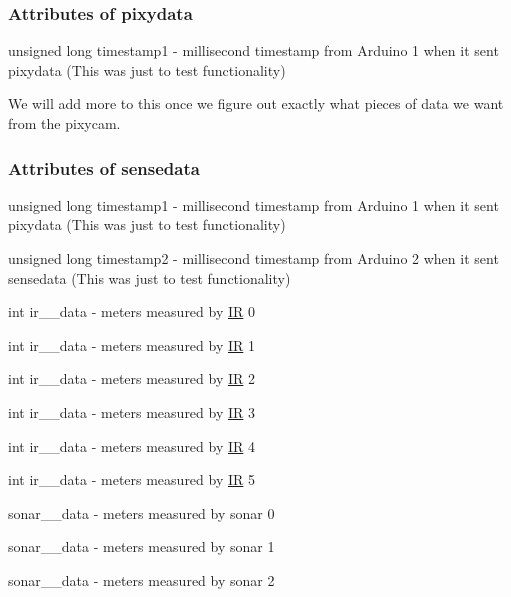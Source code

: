 \subsubsection*{Attributes of pixydata}


\begin{DoxyItemize}
\item {\ttfamily unsigned long timestamp1} -\/ millisecond timestamp from Arduino 1 when it sent {\ttfamily pixydata} (This was just to test functionality)
\end{DoxyItemize}

We will add more to this once we figure out exactly what pieces of data we want from the pixycam.

\subsubsection*{Attributes of sensedata}


\begin{DoxyItemize}
\item {\ttfamily unsigned long timestamp1} -\/ millisecond timestamp from Arduino 1 when it sent {\ttfamily pixydata} (This was just to test functionality)
\item {\ttfamily unsigned long timestamp2} -\/ millisecond timestamp from Arduino 2 when it sent {\ttfamily sensedata} (This was just to test functionality)
\item {\ttfamily int ir\+\_\+\_\+data} -\/ meters measured by \hyperlink{class_i_r}{IR} 0
\item {\ttfamily int ir\+\_\+\_\+data} -\/ meters measured by \hyperlink{class_i_r}{IR} 1
\item {\ttfamily int ir\+\_\+\_\+data} -\/ meters measured by \hyperlink{class_i_r}{IR} 2
\item {\ttfamily int ir\+\_\+\_\+data} -\/ meters measured by \hyperlink{class_i_r}{IR} 3
\item {\ttfamily int ir\+\_\+\_\+data} -\/ meters measured by \hyperlink{class_i_r}{IR} 4
\item {\ttfamily int ir\+\_\+\_\+data} -\/ meters measured by \hyperlink{class_i_r}{IR} 5
\item {\ttfamily sonar\+\_\+\_\+data} -\/ meters measured by sonar 0
\item {\ttfamily sonar\+\_\+\_\+data} -\/ meters measured by sonar 1
\item {\ttfamily sonar\+\_\+\_\+data} -\/ meters measured by sonar 2
\end{DoxyItemize}

